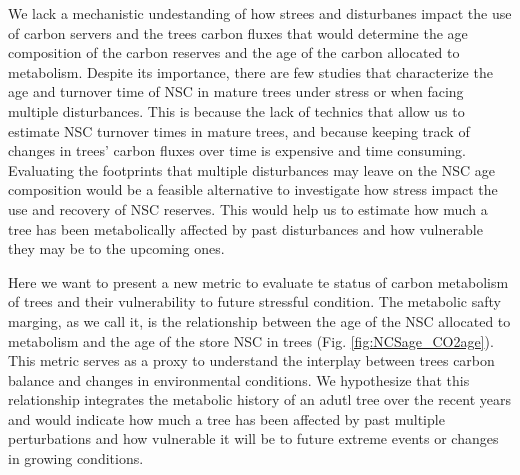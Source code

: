 \documentclass{article}
\begin{document}
We lack a mechanistic undestanding of how strees and disturbanes impact the use of carbon servers and the trees carbon fluxes that would determine the age composition of the carbon reserves and the age of the carbon allocated to metabolism. 
Despite its importance, there are few studies that characterize the age and turnover time of NSC in mature trees under stress or when facing multiple disturbances. 
This is because the lack of technics that allow us to estimate NSC turnover times in mature trees, and because keeping track of changes in trees' carbon fluxes over time is expensive and time consuming. 
Evaluating the footprints that multiple disturbances may leave on the NSC age composition would be a feasible alternative to investigate how stress impact the use and recovery of NSC reserves.
This would help us to estimate how much a tree has been metabolically affected by past disturbances and how vulnerable they may be to the upcoming ones. 



Here we want to present a new metric to evaluate te status of carbon metabolism of trees and their vulnerability to future stressful condition.
The metabolic safty marging, as we call it, is the relationship between the age of the NSC allocated to metabolism and the age of the store NSC in trees (Fig. \ref{fig:NCSage_CO2age}).
This metric serves as a proxy to understand the interplay between trees carbon balance and changes in environmental conditions. 
We hypothesize that this relationship integrates the metabolic history of an adutl tree over the recent years and would indicate how much a tree has been affected by past multiple perturbations and how vulnerable it will be to future extreme events or changes in growing conditions. 
\end{document}
